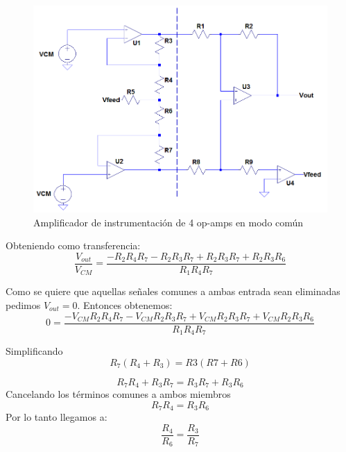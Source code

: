 	\begin{figure}[H]
		\centering
		\includegraphics[width=\linewidth]{./ImagenesVarias/inAmpVCM.png}
		\caption{Amplificador de instrumentación de 4 op-amps en modo común}
	\end{figure}
	Obteniendo como transferencia:
	\begin{equation}
		\frac{V_{out}}{V_{CM}}=
		\frac{-R_2 R_4 R_7 - 
			R_2 R_3 R_7 +
			R_2 R_3 R_7+
			R_2 R_3 R_6
		}{R_1 R_4 R_7}
	\end{equation}
		
	Como se quiere que aquellas señales comunes a ambas entrada sean eliminadas pedimos $V_{out}=0$.
	Entonces obtenemos:
		\begin{equation}
		 0=\frac{-V_{CM} R_2 R_4 R_7 - 
				V_{CM} R_2 R_3 R_7 +
				V_{CM} R_2 R_3 R_7+
				V_{CM} R_2 R_3 R_6
			}{R_1 R_4 R_7} 
		\end{equation}
	
	Simplificando
	\begin{equation}
		R_7(R_4+R_3)=R3(R7+R6)
	\end{equation}
	
	\begin{equation}
		R_7R_4+ R_3R_7=R_3R_7+R_3R_6
	\end{equation}
	Cancelando los términos comunes a ambos miembros
	\begin{equation}
		R_7R_4=R_3R_6
	\end{equation}
	Por lo tanto llegamos a:
	\begin{equation}
		\frac{R_4}{R_6}=\frac{R_3}{R_7}  %
	\end{equation}


